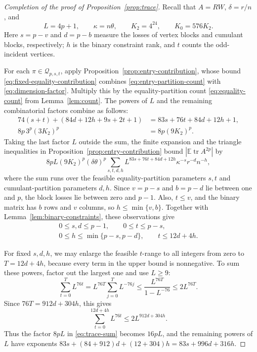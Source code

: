 \documentclass[11pt]{article}
\theoremstyle{definition}
\theoremstyle{remark}
\theoremstyle{plain}
\newcommand{\E}{\mathbb E}
\DeclareMathOperator{\tr}{tr}
\begin{document}
\begin{proof}[Completion of the proof of Proposition~\ref{prop:trace}]
Recall that $A=RW$, $\delta=r/n$, and
\[
 L=4p+1,\qquad \kappa=n\theta,\qquad
 K_2=4^{24},\qquad K_0=576K_2.
\]
Here $s=p-v$ and $d=p-b$ measure the losses of vertex blocks
and cumulant blocks, respectively; $h$ is the binary constraint
rank, and $t$ counts the odd-incident vertices.

For each $\pi\in\mathcal Q_{p,s,t}$, apply
Proposition~\ref{prop:entry-contribution}, whose bound
\eqref{eq:fixed-equality-contribution} combines
\eqref{eq:entry-partition-count} with \eqref{eq:dimension-factor}.
Multiply this by the equality-partition count \eqref{eq:equality-count}
from Lemma~\ref{lem:count}. The powers of $L$ and the remaining
combinatorial factors combine as follows:
\[
 \begin{aligned}
 74(s+t)+(84d+12h+9s+2t+1)
       &=83s+76t+84d+12h+1,\\
 8p\,3^p(3K_2)^p&=8p(9K_2)^p.
 \end{aligned}
\]
Taking the last factor $L$ outside the sum, the finite expansion
and the triangle inequalities in Proposition~\ref{prop:entry-contribution}
bound \(|\E\tr A^{2p}|\) by
\begin{equation}\label{eq:trace-sum}
 8pL(9K_2)^p(\delta\theta)^p
  \sum_{s,t,d,h}L^{83s+76t+84d+12h}\kappa^{-s}r^{-d}n^{-h},
\end{equation}
where the sum runs over the feasible equality-partition parameters
$s,t$ and cumulant-partition parameters $d,h$. Since $v=p-s$
and $b=p-d$ lie between one and $p$, the block losses lie between
zero and $p-1$. Also, $t\le v$, and the binary matrix has $b$ rows
and $v$ columns, so $h\le\min\{v,b\}$. Together with
Lemma~\ref{lem:binary-constraints}, these observations give
\[
 \begin{gathered}
  0\le s,d\le p-1,\qquad 0\le t\le p-s,\\
  0\le h\le\min\{p-s,p-d\},\qquad t\le12d+4h.
 \end{gathered}
\]

For fixed $s,d,h$, we may enlarge the feasible $t$-range to all
integers from zero to $T=12d+4h$, because every term in the upper
bound is nonnegative. To sum these powers, factor out the largest
one and use $L\ge9$:
\[
 \sum_{t=0}^{T}L^{76t}
   =L^{76T}\sum_{j=0}^{T}L^{-76j}
   \le\frac{L^{76T}}{1-L^{-76}}
   \le2L^{76T}.
\]
Since $76T=912d+304h$, this gives
\[
 \sum_{t=0}^{12d+4h}L^{76t}\le2L^{912d+304h}.
\]
Thus the factor $8pL$ in \eqref{eq:trace-sum} becomes $16pL$,
and the remaining powers of $L$ have exponents
$83s+(84+912)d+(12+304)h=83s+996d+316h$.


\end{proof}
\end{document}
